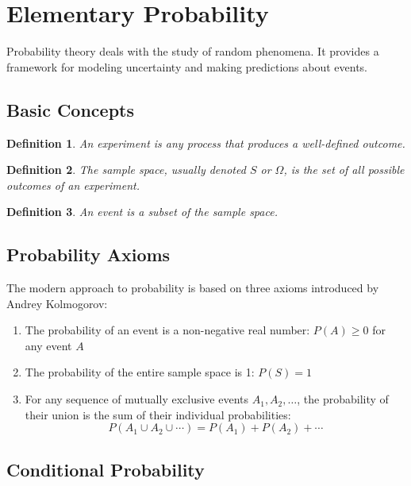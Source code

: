 \documentclass[12pt,a4paper]{article}
\newtheorem{definition}{Definition}
\begin{document}
\section{Elementary Probability}

Probability theory deals with the study of random phenomena. It provides a framework for modeling uncertainty and making predictions about events.

\subsection{Basic Concepts}

\begin{definition}
An experiment is any process that produces a well-defined outcome.
\end{definition}

\begin{definition}
The sample space, usually denoted $S$ or $\Omega$, is the set of all possible outcomes of an experiment.
\end{definition}

\begin{definition}
An event is a subset of the sample space.
\end{definition}

\subsection{Probability Axioms}

The modern approach to probability is based on three axioms introduced by Andrey Kolmogorov:

\begin{enumerate}
    \item The probability of an event is a non-negative real number: $P(A) \geq 0$ for any event $A$
    \item The probability of the entire sample space is 1: $P(S) = 1$
    \item For any sequence of mutually exclusive events $A_1, A_2, \ldots$, the probability of their union is the sum of their individual probabilities:
    \[ P(A_1 \cup A_2 \cup \cdots) = P(A_1) + P(A_2) + \cdots \]
\end{enumerate}

\subsection{Conditional Probability}
\end{document}
